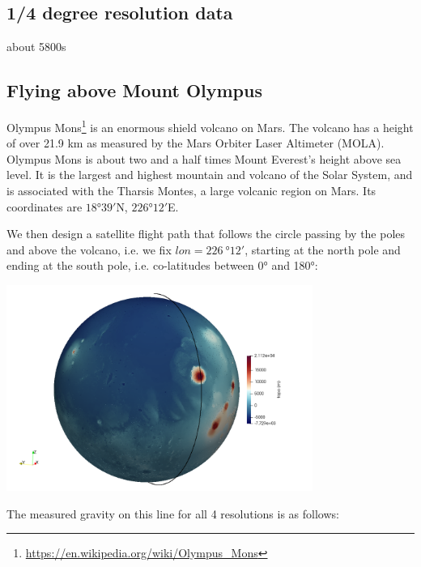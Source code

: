 \subsection*{1/4 degree resolution data}

about 5800s



\newpage
\subsection*{Flying above Mount Olympus}

Olympus Mons\footnote{\url{https://en.wikipedia.org/wiki/Olympus_Mons}} 
is an enormous shield volcano on Mars. 
The volcano has a height of over 21.9 km as measured by the Mars Orbiter Laser Altimeter (MOLA).
Olympus Mons is about two and a half times Mount Everest's height above sea level. 
It is the largest and highest mountain and volcano of the Solar System,
and is associated with the Tharsis Montes, a large volcanic region on Mars.
Its coordinates are $18\si{\degree}39'$N, $226\si{\degree}12'$E. 

We then design a satellite flight path that follows the circle passing by the poles and above 
the volcano, i.e. we fix $lon=226~\si{\degree}12'$, starting at the north pole and ending 
at the south pole, i.e. co-latitudes between 0\si{\degree} and 180\si{\degree}:

\begin{center}
\includegraphics[width=10cm]{python_codes/fieldstone_100/results/olympus/line}
\end{center}

The measured gravity on this line for all 4 resolutions is as follows:

